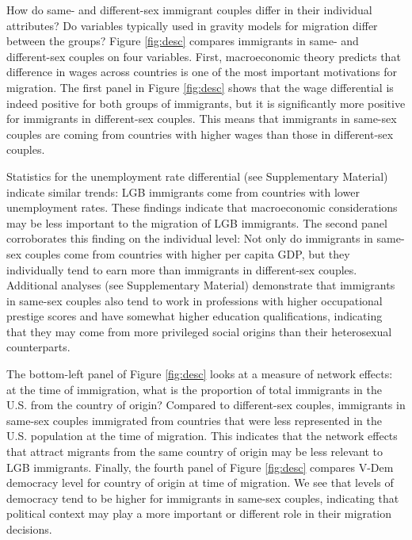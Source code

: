 \documentclass[
  11pt,
]{article}
\begin{document}
How do same- and different-sex immigrant couples differ in their individual attributes? Do variables typically used in gravity models for migration differ between the groups? Figure \ref{fig:desc} compares immigrants in same- and different-sex couples on four variables. First, macroeconomic theory predicts that difference in wages across countries is one of the most important motivations for migration. The first panel in Figure \ref{fig:desc} shows that the wage differential is indeed positive for both groups of immigrants, but it is significantly more positive for immigrants in different-sex couples. This means that immigrants in same-sex couples are coming from countries with higher wages than those in different-sex couples.

Statistics for the unemployment rate differential (see Supplementary Material) indicate similar trends: LGB immigrants come from countries with lower unemployment rates. These findings indicate that macroeconomic considerations may be less important to the migration of LGB immigrants. The second panel corroborates this finding on the individual level: Not only do immigrants in same-sex couples come from countries with higher per capita GDP, but they individually tend to earn more than immigrants in different-sex couples. Additional analyses (see Supplementary Material) demonstrate that immigrants in same-sex couples also tend to work in professions with higher occupational prestige scores and have somewhat higher education qualifications, indicating that they may come from more privileged social origins than their heterosexual counterparts.

The bottom-left panel of Figure \ref{fig:desc} looks at a measure of network effects: at the time of immigration, what is the proportion of total immigrants in the U.S. from the country of origin? Compared to different-sex couples, immigrants in same-sex couples immigrated from countries that were less represented in the U.S. population at the time of migration. This indicates that the network effects that attract migrants from the same country of origin may be less relevant to LGB immigrants. Finally, the fourth panel of Figure \ref{fig:desc} compares V-Dem democracy level for country of origin at time of migration. We see that levels of democracy tend to be higher for immigrants in same-sex couples, indicating that political context may play a more important or different role in their migration decisions.
\end{document}
